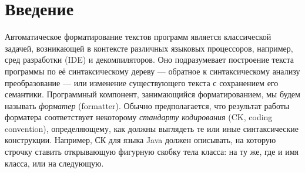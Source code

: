 \documentclass[conference]{IEEEtran}
\begin{document}
\section{Введение}
Автоматическое форматирование текстов программ является
классической задачей, возникающей в контексте различных 
языковых процессоров, например, сред разработки (IDE) и декомпиляторов.
Оно подразумевает построение текста программы по её синтаксическому
дереву --- обратное к синтаксическому анализу преобразование ---
или изменение существующего текста с сохранением его семантики.
Программный компонент, занимающийся форматированием, мы будем называть
\emph{форматер} (formatter).
Обычно предполагается, что результат работы форматера
соответствует некоторому
\emph{стандарту кодирования} (CK, coding convention), определяющему,
как должны выглядеть те или иные синтаксические конструкции.
Например, СК для языка Java должен описывать, на которую
строчку ставить открывающую фигурную скобку тела класса: 
на ту же, где и имя класса, или на следующую.









\end{document}
